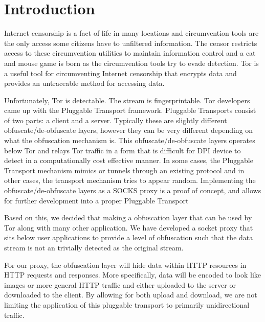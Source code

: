 \section{Introduction}
Internet censorship is a fact of life in many locations and circumvention tools are the only access some citizens have to unfiltered information. The censor restricts access to these circumvention utilities to maintain information control and a cat and mouse game is born as the circumvention tools try to evade detection. Tor is a useful tool for circumventing Internet censorship that encrypts data and provides an untraceable method for accessing data. 

Unfortunately, Tor is detectable. The stream is fingerprintable. Tor developers came up with the Pluggable Transport framework\cite{Ref1}.
Pluggable Transports consist of two parts: a client and a server. Typically these are slightly different obfuscate/de-obfuscate layers, however they can be very different depending on what the obfuscation mechanism is. This obfuscate/de-obfuscate layers operates below Tor and relays Tor traffic in a form that is difficult for DPI device to detect in a computationally cost effective manner. In some cases, the Pluggable Transport mechanism mimics or tunnels through an existing protocol\cite{Ref2,Ref3} and in other cases, the transport mechanism tries to appear random\cite{Ref4}. Implementing the obfuscate/de-obfuscate layers as a SOCKS proxy is a proof of concept, and allows for further development into a proper Pluggable Transport

Based on this, we decided that making a obfuscation layer that can be used by Tor along with many other application. We have developed a socket proxy that sits below user applications to provide a level of obfuscation such that the data stream is not an trivially detected as the original stream. 

For our proxy, the obfuscation layer will hide data within HTTP resources in HTTP requests and responses. More specifically, data will be encoded to look like images or more general HTTP traffic and either uploaded to the server or downloaded to the client. By allowing for both upload and download, we are not limiting the application of this pluggable transport to primarily unidirectional traffic. %
